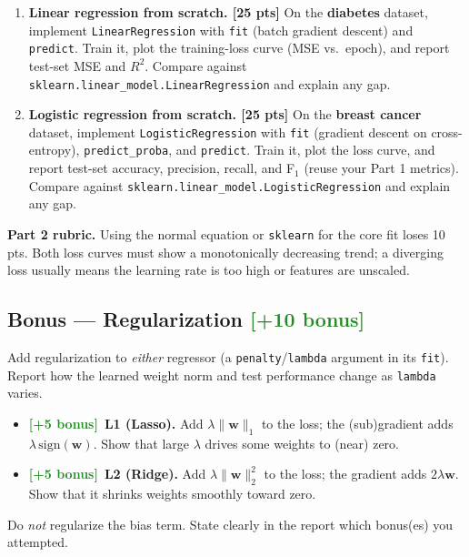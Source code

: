 \documentclass[11pt,a4paper]{article}
\newcommand{\points}[1]{\textcolor{accent}{\textbf{[#1 pts]}}}
\newcommand{\bonus}[1]{\textcolor{ForestGreen}{\textbf{[+#1 bonus]}}}
\newcommand{\ww}{\mathbf{w}}
\begin{document}
\begin{enumerate}[label=\textbf{2.\arabic*},leftmargin=2.4em,itemsep=4pt]
  \item \textbf{Linear regression from scratch. \points{25}} On the \textbf{diabetes} dataset, implement \texttt{LinearRegression} with \texttt{fit} (batch gradient descent) and \texttt{predict}. Train it, plot the training-loss curve (MSE vs.\ epoch), and report test-set MSE and $R^2$. Compare against \texttt{sklearn.linear\_model.LinearRegression} and explain any gap.

  \item \textbf{Logistic regression from scratch. \points{25}} On the \textbf{breast cancer} dataset, implement \texttt{LogisticRegression} with \texttt{fit} (gradient descent on cross-entropy), \texttt{predict\_proba}, and \texttt{predict}. Train it, plot the loss curve, and report test-set accuracy, precision, recall, and F$_1$ (reuse your Part 1 metrics). Compare against \texttt{sklearn.linear\_model.LogisticRegression} and explain any gap.
\end{enumerate}

\begin{rubricbox}
\textbf{Part 2 rubric.} Using the normal equation or \texttt{sklearn} for the core fit loses 10 pts. Both loss curves must show a monotonically decreasing trend; a diverging loss usually means the learning rate is too high or features are unscaled.
\end{rubricbox}

\subsection*{Bonus --- Regularization \bonus{10}}
Add regularization to \emph{either} regressor (a \texttt{penalty}/\texttt{lambda} argument in its \texttt{fit}). Report how the learned weight norm and test performance change as \texttt{lambda} varies.
\begin{itemize}[topsep=2pt,itemsep=1pt]
  \item \bonus{5}\ \textbf{L1 (Lasso).} Add $\lambda\lVert\ww\rVert_1$ to the loss; the (sub)gradient adds $\lambda\,\mathrm{sign}(\ww)$. Show that large $\lambda$ drives some weights to (near) zero.
  \item \bonus{5}\ \textbf{L2 (Ridge).} Add $\lambda\lVert\ww\rVert_2^2$ to the loss; the gradient adds $2\lambda\ww$. Show that it shrinks weights smoothly toward zero.
\end{itemize}
Do \emph{not} regularize the bias term. State clearly in the report which bonus(es) you attempted.
\end{document}
